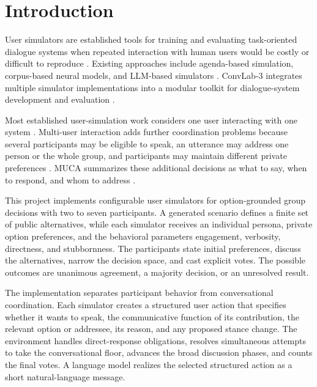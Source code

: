 \section{Introduction}

User simulators are established tools for training and evaluating task-oriented dialogue systems when repeated interaction with human users would be costly or difficult to reproduce \citep{schatzmann2007agenda,kreyssig2018neural,sekulic2024reliable}. Existing approaches include agenda-based simulation, corpus-based neural models, and LLM-based simulators \citep{schatzmann2007agenda,kreyssig2018neural,sekulic2024reliable}. ConvLab-3 integrates multiple simulator implementations into a modular toolkit for dialogue-system development and evaluation \citep{zhu2023convlab3}.

Most established user-simulation work considers one user interacting with one system \citep{schatzmann2007agenda,kreyssig2018neural,sekulic2024reliable}. Multi-user interaction adds further coordination problems because several participants may be eligible to speak, an utterance may address one person or the whole group, and participants may maintain different private preferences \citep{mao2024muca,ouchi2016addressee,nonomura2025whospeaks}. MUCA summarizes these additional decisions as what to say, when to respond, and whom to address \citep{mao2024muca}.

This project implements configurable user simulators for option-grounded group decisions with two to seven participants. A generated scenario defines a finite set of public alternatives, while each simulator receives an individual persona, private option preferences, and the behavioral parameters engagement, verbosity, directness, and stubbornness. The participants state initial preferences, discuss the alternatives, narrow the decision space, and cast explicit votes. The possible outcomes are unanimous agreement, a majority decision, or an unresolved result.

The implementation separates participant behavior from conversational coordination. Each simulator creates a structured user action that specifies whether it wants to speak, the communicative function of its contribution, the relevant option or addressee, its reason, and any proposed stance change. The environment handles direct-response obligations, resolves simultaneous attempts to take the conversational floor, advances the broad discussion phases, and counts the final votes. A language model realizes the selected structured action as a short natural-language message.

